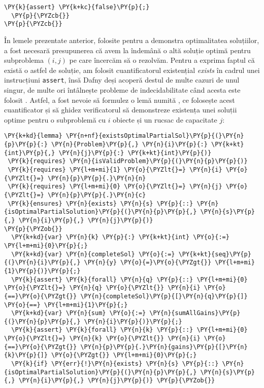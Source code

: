 \begin{sloppypar}
\begin{Verbatim}[commandchars=\\\{\}]
    \PY{k}{assert} \PY{k+kc}{false}\PY{p}{;}
  \PY{p}{\PYZcb{}}
\PY{p}{\PYZcb{}}
\end{Verbatim}
\hspace{4mm}În lemele prezentate anterior, folosite pentru a demonstra optimalitatea soluțiilor, a fost necesară presupunerea că avem la îndemână o altă soluție optimă pentru subproblema $(i, j)$ pe care încercăm să o rezolvăm. Pentru a exprima faptul că există o astfel de soluție, am folosit cuantificatorul existențial \textit{exists} în cadrul unei instrucțiuni \texttt{assert}, însă Dafny deși acoperă destul de multe cazuri de unul singur, de multe ori întâlnește probleme de indecidabilitate când acesta este folosit \cite{FAQ}. Astfel, a fost nevoie să formulez o lemă numită , ce folosește acest cuantificator și să ghidez verificatorul să demonstreze existența unei soluții optime pentru o subproblemă cu $i$ obiecte și un rucsac de capacitate $j$:
\begin{Verbatim}[commandchars=\\\{\}]
\PY{k+kd}{lemma} \PY{n+nf}{existsOptimalPartialSol}\PY{p}{(}\PY{n}{p}\PY{p}{:} \PY{n}{Problem}\PY{p}{,} \PY{n}{i}\PY{p}{:} \PY{k+kt}{int}\PY{p}{,} \PY{n}{j}\PY{p}{:} \PY{k+kt}{int}\PY{p}{)} 
 \PY{k}{requires} \PY{n}{isValidProblem}\PY{p}{(}\PY{n}{p}\PY{p}{)}
 \PY{k}{requires} \PY{l+m+mi}{1} \PY{o}{\PYZlt{}=} \PY{n}{i} \PY{o}{\PYZlt{}=} \PY{n}{p}\PY{p}{.}\PY{n}{n}
 \PY{k}{requires} \PY{l+m+mi}{0} \PY{o}{\PYZlt{}=} \PY{n}{j} \PY{o}{\PYZlt{}=} \PY{n}{p}\PY{p}{.}\PY{n}{c}
 \PY{k}{ensures} \PY{n}{exists} \PY{n}{s} \PY{p}{::} \PY{n}{isOptimalPartialSolution}\PY{p}{(}\PY{n}{p}\PY{p}{,} \PY{n}{s}\PY{p}{,} \PY{n}{i}\PY{p}{,} \PY{n}{j}\PY{p}{)}
\PY{p}{\PYZob{}}
  \PY{k+kd}{var} \PY{n}{k} \PY{p}{:} \PY{k+kt}{int} \PY{o}{:=} \PY{l+m+mi}{0}\PY{p}{;}
  \PY{k+kd}{var} \PY{n}{completeSol} \PY{o}{:=} \PY{k+kt}{seq}\PY{p}{(}\PY{n}{i}\PY{p}{,} \PY{n}{y} \PY{o}{=}\PY{o}{\PYZgt{}} \PY{l+m+mi}{1}\PY{p}{)}\PY{p}{;}
  \PY{k}{assert} \PY{k}{forall} \PY{n}{q} \PY{p}{::} \PY{l+m+mi}{0} \PY{o}{\PYZlt{}=} \PY{n}{q} \PY{o}{\PYZlt{}} \PY{n}{i} \PY{o}{==}\PY{o}{\PYZgt{}} \PY{n}{completeSol}\PY{p}{[}\PY{n}{q}\PY{p}{]} \PY{o}{==} \PY{l+m+mi}{1}\PY{p}{;}
  \PY{k+kd}{var} \PY{n}{sum} \PY{o}{:=} \PY{n}{sumAllGains}\PY{p}{(}\PY{n}{p}\PY{p}{,} \PY{n}{i}\PY{p}{)}\PY{p}{;}
  \PY{k}{assert} \PY{k}{forall} \PY{n}{k} \PY{p}{::} \PY{l+m+mi}{0} \PY{o}{\PYZlt{}=} \PY{n}{k} \PY{o}{\PYZlt{}} \PY{n}{i} \PY{o}{==}\PY{o}{\PYZgt{}} \PY{n}{p}\PY{p}{.}\PY{n}{gains}\PY{p}{[}\PY{n}{k}\PY{p}{]} \PY{o}{\PYZgt{}} \PY{l+m+mi}{0}\PY{p}{;}
  \PY{k}{if} \PY{err}{!}\PY{n}{exists} \PY{n}{s} \PY{p}{::} \PY{n}{isOptimalPartialSolution}\PY{p}{(}\PY{n}{p}\PY{p}{,} \PY{n}{s}\PY{p}{,} \PY{n}{i}\PY{p}{,} \PY{n}{j}\PY{p}{)} \PY{p}{\PYZob{}}

\end{Verbatim}
\end{sloppypar}
